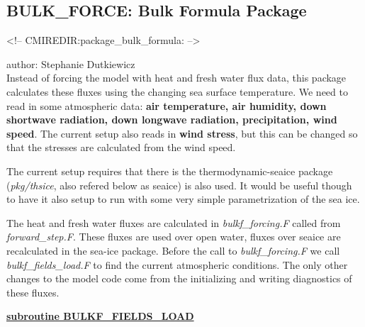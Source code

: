 % 
% 
% 
% 
% 

\def\deg{$^o$}
\subsection{BULK\_FORCE: Bulk Formula Package}
\label{sec:pkg:bulk_formula}
\begin{rawhtml}
<!-- CMIREDIR:package_bulk_formula: -->
\end{rawhtml}

author: Stephanie Dutkiewicz\\

\noindent
Instead of forcing the model with heat and fresh water flux data,
this package calculates these fluxes using the changing sea surface
temperature. We need to read in some atmospheric data:
{\bf air temperature, air humidity, down shortwave radiation,
     down longwave radiation, precipitation, wind speed}.
The current setup also reads in {\bf wind stress}, but this
can be changed so that the stresses are calculated from the
wind speed.

The current setup requires that there is the thermodynamic-seaice package
({\it pkg/thsice}, also refered below as seaice)
is also used. It would be useful though to have it also
setup to run with some very simple parametrization of the sea ice.


\vspace{1cm}

\noindent
The heat and fresh water fluxes are calculated in {\it bulkf\_forcing.F}
called from {\it forward\_step.F}. These fluxes are used over open water,
fluxes over seaice are recalculated in the sea-ice package.
Before the call to {\it bulkf\_forcing.F} we call 
{\it bulkf\_fields\_load.F} to find the current atmospheric conditions.
The only other changes to the model code come from the initializing
and writing diagnostics of these fluxes.

\vspace{1cm}
\noindent
{\bf \underline{subroutine BULKF\_FIELDS\_LOAD}}

